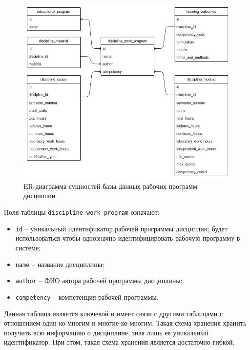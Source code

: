 \begin{figure}[h!]
	\begin{center}
		\includegraphics[scale=0.5]{img/er-storage.jpeg}
	\end{center}
	\captionsetup{justification=centering}
	\caption{ER-диаграмма сущностей базы данных рабочих программ дисциплин}
	\label{img:er-storage}
\end{figure}

Поля таблицы \texttt{discipline\_work\_program} означают:

\begin{itemize}
	\item \texttt{id} -- уникальный идентификатор рабочей программы дисциплин; будет использоваться чтобы однозначно идентифицировать рабочую программу в системе;
	\item \texttt{name} -- название дисциплины;
	\item \texttt{author} -- ФИО автора рабочей программы дисциплины; 
	\item \texttt{competency} -- компетенция рабочей программы.
\end{itemize}

Данная таблица является ключевой и имеет связи с другими таблицами с отношением один-ко-многим и многие-ко-многим. Такая схема хранения хранить получить всю информацию о дисциплине, зная лишь ее уникальный идентификатор. При этом, такая схема хранения является достаточно гибкой.\\

